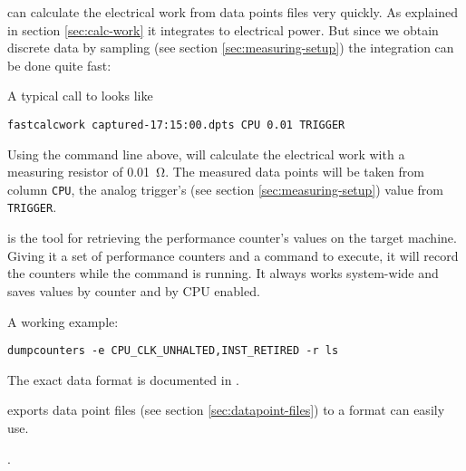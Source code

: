 \JWlfour{\JWTfcw}

\JWTfcw can calculate the electrical work from data points files very quickly.
As explained in section \ref{sec:calc-work} it integrates to electrical power.
But since we obtain discrete data by sampling (see section
\ref{sec:measuring-setup}) the integration can be done quite fast:


A typical call to \JWTfcw looks like

\begin{lstlisting}[style=Shell]
fastcalcwork captured-17:15:00.dpts CPU 0.01 TRIGGER
\end{lstlisting}

Using the command line above, \JWTfcw will calculate the electrical work with a
measuring resistor of \SI{0.01}{\ohm}. The measured data points will be taken
from column \texttt{CPU}, the analog trigger's (see section
\ref{sec:measuring-setup}) value from \texttt{TRIGGER}.


\JWlfour{\JWTdc}

\JWTdc is the tool for retrieving the performance counter's values on the target
machine. Giving it a set of performance counters and a command to execute, it
will record the counters while the command is running. It always works
system-wide and saves values by counter and by CPU enabled.

A working example:

\begin{lstlisting}[style=Shell]
dumpcounters -e CPU_CLK_UNHALTED,INST_RETIRED -r ls
\end{lstlisting}

The exact data format is documented in .

\JWlfour{\JWTde}

\JWTde exports data point files (see section \ref{sec:datapoint-files}) to a
format \JWTR can easily use.

.

\JWlfour{\JWTdd}


\JWlfour{\JWTbsle}


